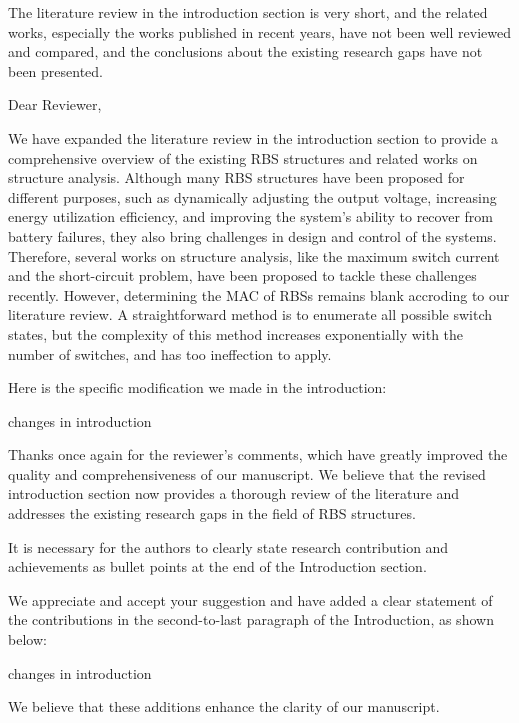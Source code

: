 \documentclass[12pt,american]{scrartcl}
\begin{document}
\begin{revcomment}
  The literature review in the introduction section is very short, and the related works, especially the works published in recent years, have not been well reviewed and compared, and the conclusions about the existing research gaps have not been presented.
\end{revcomment}
\begin{revresponse}

Dear Reviewer,




We have expanded the literature review in the introduction section to provide a comprehensive overview of the existing RBS structures and related works on structure analysis. 
Although many RBS structures have been proposed for different purposes, such as dynamically adjusting the output voltage, increasing energy utilization efficiency, and improving the system's ability to recover from battery failures, they also bring challenges in design and control of the systems.
Therefore, several works on structure analysis, like the maximum switch current and the short-circuit problem, have been proposed to tackle these challenges recently.
However, determining the MAC of RBSs remains blank accroding to our literature review.
A straightforward method is to enumerate all possible switch states, but the complexity of this method increases exponentially with the number of switches, and has too ineffection to apply.


Here is the specific modification we made in the introduction:
\begin{changes}
  changes in introduction
\end{changes}

  
Thanks once again for the reviewer's comments, which have greatly improved the quality and comprehensiveness of our manuscript. We believe that the revised introduction section now provides a thorough review of the literature and addresses the existing research gaps in the field of RBS structures.
  
\end{revresponse}

\begin{revcomment}
  It is necessary for the authors to clearly state research contribution and achievements as bullet points at the end of the Introduction section.
\end{revcomment}
\begin{revresponse}

We appreciate and accept your suggestion and have added a clear statement of the contributions in the second-to-last paragraph of the Introduction, as shown below:
\begin{changes}
  changes in introduction
\end{changes}


We believe that these additions enhance the clarity of our manuscript. 

\end{revresponse}
\end{document}
